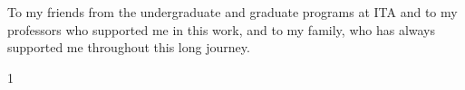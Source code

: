 \maketitle

\begin{itadedication}
To my friends from the undergraduate and graduate programs at ITA and to my
professors who supported me in this work, and to my family, who has always
supported me throughout this long journey.
\end{itadedication}

\begin{itathanks}

\end{itathanks}

\thispagestyle{empty}
\ifhyperref{}\fi
\begin{flushright}
\begin{spacing}{1}
\mbox{}\vfill

\end{spacing}
\end{flushright}

\begin{abstract}
\noindent

\end{abstract}

\begin{englishabstract}
\noindent

\end{englishabstract}

\listoffigures %

\listoftables %

\listofabbreviations

\listofsymbols

\tableofcontents
